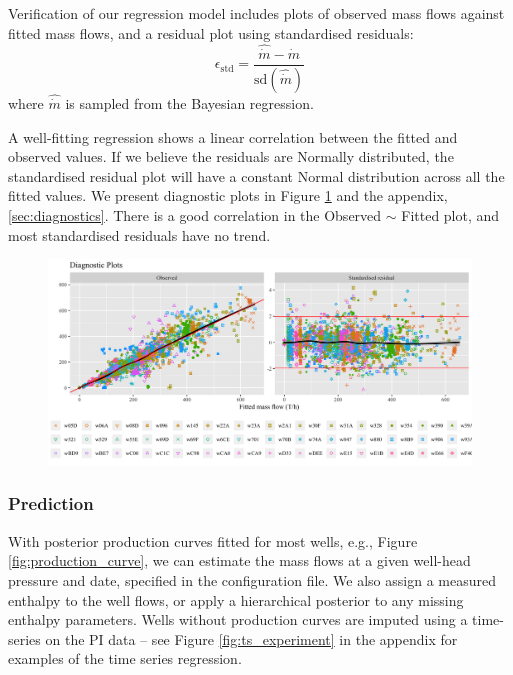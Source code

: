 \documentclass[a4paper, 12pt]{article}
\begin{document}
Verification of our regression model includes plots of observed mass flows against fitted mass flows, and a residual plot using standardised residuals:
\begin{equation}
\epsilon_\text{std} = \frac{\hat{\dot{m}} - \dot{m}}{\text{sd}\left( \hat{\dot{m}} \right)}
\end{equation}
where $\hat{\dot{m}}$ is sampled from the Bayesian regression.

A well-fitting regression shows a linear correlation between the fitted and observed values. If we believe the residuals are Normally distributed, the standardised residual plot will have a constant Normal distribution across all the fitted values. We present diagnostic plots in Figure \ref{fig:diagnostics} and the appendix, \ref{sec:diagnostics}. There is a good correlation in the Observed $\sim$ Fitted plot, and most standardised residuals have no trend. %

\begin{figure}
\centering
  \includegraphics[width=\linewidth]{media/diagnostics}
  \label{fig:diagnostics}
\end{figure}

\subsubsection{Prediction}
With posterior production curves fitted for most wells, e.g., Figure \ref{fig:production_curve}, we can estimate the mass flows at a given well-head pressure and date, specified in the configuration file. We also assign a measured enthalpy to the well flows, or apply a hierarchical posterior to any missing enthalpy parameters. Wells without production curves are imputed using a time-series on the PI data -- see Figure \ref{fig:ts_experiment} in the appendix for examples of the time series regression.
\end{document}
